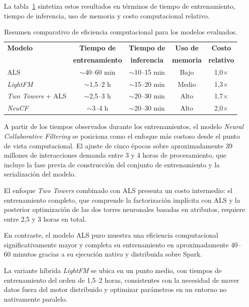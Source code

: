 La tabla~\ref{tab:efficiency_metrics} sintetiza estos resultados en términos de tiempo de entrenamiento, tiempo de inferencia, uso de memoria y costo computacional relativo.

\begin{table}[H]
    \centering
    \caption[Resumen de eficiencia computacional]{Resumen comparativo de eficiencia computacional para los modelos evaluados.}
    \begin{tabular}{l c c c c}
        \toprule
        \textbf{Modelo} & \textbf{Tiempo de} & \textbf{Tiempo de} & \textbf{Uso de} & \textbf{Costo} \\
        & \textbf{entrenamiento} & \textbf{inferencia} & \textbf{memoria} & \textbf{relativo} \\
        \midrule
        ALS & $\sim$40--60 min & $\sim$10--15 min & Bajo & 1{,}0$\times$ \\
        \textit{LightFM} & $\sim$1{,}5--2 h & $\sim$15--20 min & Medio & 1{,}3$\times$ \\
        \textit{Two Towers} + ALS & $\sim$2{,}5--3 h & $\sim$20--30 min & Alto & 1{,}7$\times$ \\
        \textit{NeuCF} & $\sim$3--4 h & $\sim$20--30 min & Alto & 2{,}0$\times$ \\
        \bottomrule
    \end{tabular}
    \label{tab:efficiency_metrics}
\end{table}

A partir de los tiempos observados durante los entrenamientos, el modelo \textit{Neural Collaborative Filtering} se posiciona como el enfoque más costoso desde el punto de vista computacional.  
El ajuste de cinco épocas sobre aproximadamente 39 millones de interacciones demanda entre 3 y 4 horas de procesamiento, que incluye la fase previa de construcción del conjunto de entrenamiento y la serialización del modelo.

El enfoque \textit{Two Towers} combinado con ALS presenta un costo intermedio: el entrenamiento completo, que comprende la factorización implícita con ALS y la posterior optimización de las dos torres neuronales basadas en atributos, requiere entre 2,5 y 3 horas en total.

En contraste, el modelo ALS puro muestra una eficiencia computacional significativamente mayor y completa su entrenamiento en aproximadamente 40–60 minutos gracias a su ejecución nativa y distribuida sobre Spark.  

La variante híbrida \textit{LightFM} se ubica en un punto medio, con tiempos de entrenamiento del orden de 1,5–2 horas, consistentes con la necesidad de mover datos fuera del motor distribuido y optimizar parámetros en un entorno no nativamente paralelo.

